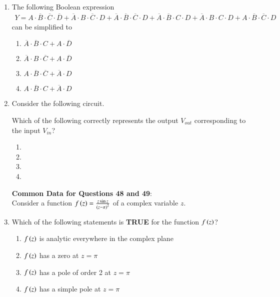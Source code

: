 \documentclass[journal]{IEEEtran}
\begin{document}
\begin{enumerate}
    \item The following Boolean expression
    \begin{align*}
    Y = A \cdot \overline{B} \cdot \overline{C} \cdot \overline{D}
    + \overline{A} \cdot B \cdot \overline{C} \cdot D
    + \overline{A} \cdot \overline{B} \cdot \overline{C} \cdot D
    + \overline{A} \cdot \overline{B} \cdot C \cdot D
    + \overline{A} \cdot B \cdot C \cdot D
    + A \cdot \overline{B} \cdot \overline{C} \cdot D
    \end{align*}
    can be simplified to
    \begin{multicols}{2}
        \begin{enumerate}
            \item $\overline{A} \cdot \overline{B} \cdot C + A \cdot \overline{D}$
            \item $\overline{A} \cdot B \cdot \overline{C} + A \cdot \overline{D}$
            \item $A \cdot \overline{B} \cdot \overline{C} + \overline{A} \cdot D$
            \item $A \cdot \overline{B} \cdot C + \overline{A} \cdot D$
        \end{enumerate}
    \end{multicols}

    \item Consider the following circuit.

    

    Which of the following correctly represents the output $V_{out}$ corresponding to the input $V_{in}$?

    \begin{multicols}{2}
        \begin{enumerate}
            \item 
            \item 
            \item 
            \item 
        \end{enumerate}
    \end{multicols}

    \textbf{Common Data for Questions 48 and 49}: \\
    Consider a function $f\left(z\right) = \frac{z \sin z}{\left(z - \pi\right)^2}$ of a complex variable $z$.
    
    \item Which of the following statements is \textbf{TRUE} for the function $f\left(z\right)$?
    \begin{enumerate}
        \item $f\left(z\right)$ is analytic everywhere in the complex plane
        \item $f\left(z\right)$ has a zero at $z = \pi$
        \item $f\left(z\right)$ has a pole of order 2 at $z = \pi$
        \item $f\left(z\right)$ has a simple pole at $z = \pi$
    \end{enumerate}
    

\end{enumerate}
\end{document}
